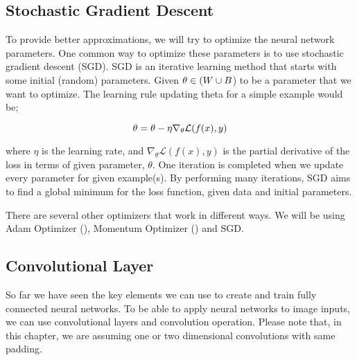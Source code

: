 \subsection{Stochastic Gradient Descent}
To provide better approximations, we will try to optimize the neural network parameters. One common way to optimize these parameters is to use stochastic gradient descent (SGD). SGD is an iterative learning method that starts with some initial (random) parameters. Given $\theta \in (\all\weights \cup \all\biasterm$) to be a parameter that we want to optimize. The learning rule updating theta for a simple example would be;

$$ \theta = \theta- \eta \nabla_\theta{\mathcal{L}(f(x),y)} $$

where $\eta$ is the learning rate, and $\nabla_\theta{\mathcal{L}(f(x), y)}$ is the partial derivative of the loss in terms of given parameter, $\theta$. One iteration is completed when we update every parameter for given example(s). By performing many iterations, SGD aims to find a global minimum for the loss function, given data and initial parameters.

There are several other optimizers that work in different ways. We will be using Adam Optimizer (\cite{kingma2014adam}), Momentum Optimizer (\cite{qian1999momentum}) and SGD.

\iffalse
\subsection{Training a Neural Network}
Training is the process of learning the best weights given a set of samples. When describing the training process of a model, we will define the configuration we have used. This configuration consists of number of Epochs, batch size, training/validation datasets, loss, optimizer and finally network configuration. 
We will start by defining the network configuration. The network configuration is basically setting up the neural network graph and its operations. Starting from the input nodes we define every layer up to the output layer. To do that, first we need to define our training dataset because the training dataset defines the shape of our input and output layers. Then we will define a loss for the output layer. Using this loss we will define our optimizer. 
\fi

\subsection{Convolutional Layer}
So far we have seen the key elements we can use to create and train fully connected neural networks. To be able to apply neural networks to image inputs, we can use convolutional layers and convolution operation. Please note that, in this chapter, we are assuming one or two dimensional convolutions with same padding. 

